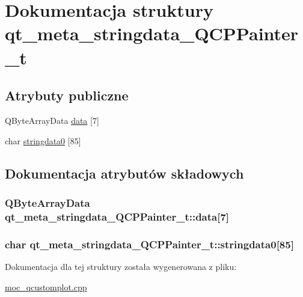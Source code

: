 \hypertarget{structqt__meta__stringdata___q_c_p_painter__t}{}\section{Dokumentacja struktury qt\+\_\+meta\+\_\+stringdata\+\_\+\+Q\+C\+P\+Painter\+\_\+t}
\label{structqt__meta__stringdata___q_c_p_painter__t}
\subsection*{Atrybuty publiczne}
\begin{DoxyCompactItemize}
\item 
Q\+Byte\+Array\+Data \hyperlink{structqt__meta__stringdata___q_c_p_painter__t_ad207c5d12c2c25b489d92c783a387865}{data} \mbox{[}7\mbox{]}
\item 
char \hyperlink{structqt__meta__stringdata___q_c_p_painter__t_a5a729fecff22f5c3258902008085a51f}{stringdata0} \mbox{[}85\mbox{]}
\end{DoxyCompactItemize}


\subsection{Dokumentacja atrybutów składowych}
\subsubsection[{\texorpdfstring{data}{data}}]{\setlength{\rightskip}{0pt plus 5cm}Q\+Byte\+Array\+Data qt\+\_\+meta\+\_\+stringdata\+\_\+\+Q\+C\+P\+Painter\+\_\+t\+::data\mbox{[}7\mbox{]}}\hypertarget{structqt__meta__stringdata___q_c_p_painter__t_ad207c5d12c2c25b489d92c783a387865}{}\label{structqt__meta__stringdata___q_c_p_painter__t_ad207c5d12c2c25b489d92c783a387865}
\subsubsection[{\texorpdfstring{stringdata0}{stringdata0}}]{\setlength{\rightskip}{0pt plus 5cm}char qt\+\_\+meta\+\_\+stringdata\+\_\+\+Q\+C\+P\+Painter\+\_\+t\+::stringdata0\mbox{[}85\mbox{]}}\hypertarget{structqt__meta__stringdata___q_c_p_painter__t_a5a729fecff22f5c3258902008085a51f}{}\label{structqt__meta__stringdata___q_c_p_painter__t_a5a729fecff22f5c3258902008085a51f}


Dokumentacja dla tej struktury została wygenerowana z pliku\+:\begin{DoxyCompactItemize}
\item 
\hyperlink{moc__qcustomplot_8cpp}{moc\+\_\+qcustomplot.\+cpp}\end{DoxyCompactItemize}
